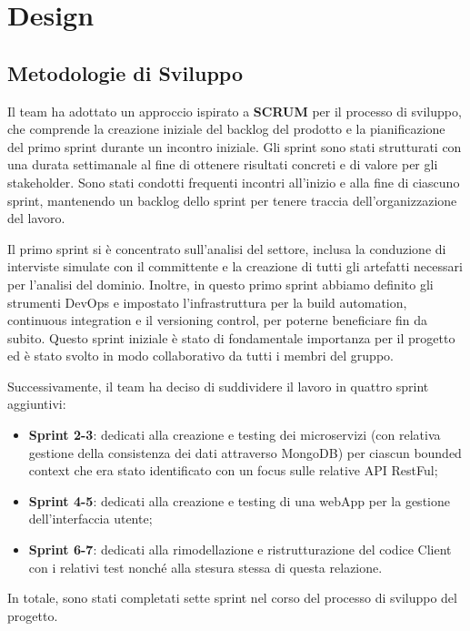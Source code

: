 \section{Design}
\subsection{Metodologie di Sviluppo}

Il team ha adottato un approccio ispirato a \textbf{SCRUM} per il processo di sviluppo,
che comprende la creazione iniziale del backlog del prodotto e la pianificazione
del primo sprint durante un incontro iniziale.
Gli sprint sono stati strutturati con una durata settimanale al fine di ottenere
risultati concreti e di valore per gli stakeholder. Sono stati condotti frequenti
incontri all'inizio e alla fine di ciascuno sprint, mantenendo un backlog dello sprint
per tenere traccia dell'organizzazione del lavoro.

Il primo sprint si è concentrato sull'analisi del settore, inclusa la conduzione di
interviste simulate con il committente e la creazione di tutti gli artefatti necessari
per l'analisi del dominio. Inoltre, in questo primo sprint abbiamo definito gli strumenti
DevOps e impostato l'infrastruttura per la build automation, continuous integration
e il versioning control, per poterne beneficiare fin da subito. Questo sprint iniziale
è stato di fondamentale importanza per il progetto ed è stato svolto in modo collaborativo
da tutti i membri del gruppo.

Successivamente, il team ha deciso di suddividere il lavoro in quattro sprint aggiuntivi:

\begin{itemize}
    \item \textbf{Sprint 2-3}: dedicati alla creazione e testing dei microservizi (con relativa gestione della consistenza dei dati attraverso MongoDB) per ciascun bounded context che era stato identificato con un focus sulle relative API RestFul;
    \item \textbf{Sprint 4-5}: dedicati alla creazione e testing di una webApp per la gestione dell’interfaccia utente;
    \item \textbf{Sprint 6-7}: dedicati alla rimodellazione e ristrutturazione del codice Client con i relativi test nonché alla stesura stessa di questa relazione.
\end{itemize}

In totale, sono stati completati sette sprint nel corso del processo di sviluppo del progetto.\vspace{3mm}

